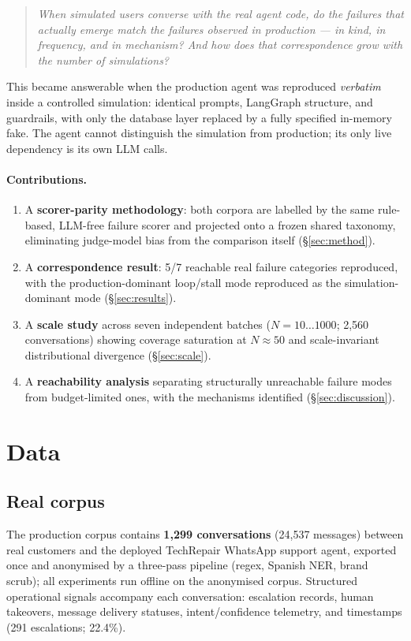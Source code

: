 \documentclass[11pt,a4paper]{article}
\begin{document}
\begin{quote}
\itshape When simulated users converse with the real agent code, do the failures that actually
emerge match the failures observed in production --- in kind, in frequency, and in mechanism?
And how does that correspondence grow with the number of simulations?
\end{quote}

\noindent This became answerable when the production agent was reproduced \emph{verbatim} inside
a controlled simulation: identical prompts, LangGraph structure, and guardrails, with only the
database layer replaced by a fully specified in-memory fake. The agent cannot distinguish the
simulation from production; its only live dependency is its own LLM calls.

\paragraph{Contributions.}
\begin{enumerate}[itemsep=2pt]
  \item A \textbf{scorer-parity methodology}: both corpora are labelled by the same rule-based,
        LLM-free failure scorer and projected onto a frozen shared taxonomy, eliminating
        judge-model bias from the comparison itself (\S\ref{sec:method}).
  \item A \textbf{correspondence result}: 5/7 reachable real failure categories reproduced,
        with the production-dominant loop/stall mode reproduced as the simulation-dominant mode
        (\S\ref{sec:results}).
  \item A \textbf{scale study} across seven independent batches ($N=10\ldots1000$; 2{,}560
        conversations) showing coverage saturation at $N\!\approx\!50$ and scale-invariant
        distributional divergence (\S\ref{sec:scale}).
  \item A \textbf{reachability analysis} separating structurally unreachable failure modes from
        budget-limited ones, with the mechanisms identified (\S\ref{sec:discussion}).
\end{enumerate}

\section{Data}
\label{sec:data}

\subsection{Real corpus}
The production corpus contains \textbf{1{,}299 conversations} (24{,}537 messages) between real
customers and the deployed TechRepair WhatsApp support agent, exported once and anonymised by a
three-pass pipeline (regex, Spanish NER, brand scrub); all experiments run offline on the
anonymised corpus. Structured operational signals accompany each conversation: escalation records,
human takeovers, message delivery statuses, intent/confidence telemetry, and timestamps
(291 escalations; 22.4\%).
\end{document}

